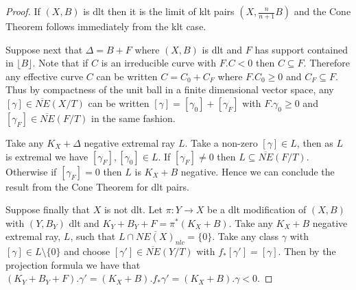 \begin{proof}
	If $(X,B)$ is dlt then it is the limit of klt pairs $(X,\frac{n}{n+1}B)$ and the Cone Theorem follows immediately from the klt case.
	
%	
	Suppose next that $\Delta=B+F$ where $(X,B)$ is dlt and $F$ has support contained in $\lfloor B \rfloor$. Note that if $C$ is an irreducible curve with $F.C <0$ then $C \subseteq F$. Therefore any effective curve $C$ can be written $C=C_{0} +C_{F}$ where $F.C_{0}\geq 0$ and $C_{F} \subseteq F$. Thus by compactness of the unit ball in a finite dimensional vector space, any $[\gamma] \in \overline{NE}(X/T)$ can be written $[\gamma] = [\gamma_{0}] + [\gamma_{F}]$ with $F.\gamma_{0} \geq 0$ and $[\gamma_{F}] \in \overline{NE}(F/T)$ in the same fashion.
	
	Take any $K_{X}+\Delta$ negative extremal ray $L$. Take a non-zero $[\gamma] \in L$, then as $L$ is extremal we have $[\gamma_{F}],[\gamma_{0}] \in L$. If $[\gamma_{F}] \neq 0$ then $L \subseteq \overline{NE}(F/T)$. Otherwise if $[\gamma_{F}]=0$ then $L$ is $K_{X}+B$ negative. Hence we can conclude the result from the Cone Theorem for dlt pairs.
	
		
	Suppose finally that $X$ is not dlt. Let $\pi \colon Y \to X$ be a dlt modification of $(X,B)$ with $(Y,B_{Y})$ dlt and $K_{Y}+B_{Y}+F=\pi^{*}(K_{X}+B)$. Take any $K_{X}+B$ negative extremal ray, $L$, such that $L \cap\overline{NE(X)}_{nlc}=\{0\}$. Take any class $\gamma$ with $[\gamma] \in L\setminus \{0\}$ and choose $[\gamma'] \in \overline{NE}(Y/T)$ with $f_{*}[\gamma']=[\gamma]$. Then by the projection formula we have that $(K_{Y}+B_{Y}+F).\gamma'=(K_{X}+B).f_{*}\gamma'=(K_{X}+B).\gamma < 0$. 


\end{proof}
